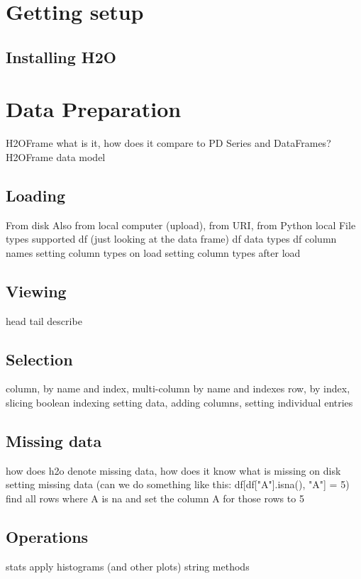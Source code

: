 \section{Getting setup}

\subsection{Installing H2O}


\section{Data Preparation}
H2OFrame what is it, how does it compare to PD Series and DataFrames?
H2OFrame data model

\subsection{Loading}
From disk
Also from local computer (upload), from URI, from Python local
File types supported
df (just looking at the data frame)
df data types
df column names
setting column types on load
setting column types after load

\subsection{Viewing}
head
tail
describe

\subsection{Selection}
column, by name and index, multi-column by name and indexes
row, by index, slicing
boolean indexing
setting data, adding columns, setting individual entries

\subsection{Missing data}
how does h2o denote missing data, how does it know what is missing on disk
setting missing data (can we do something like this: df[df["A"].isna(), "A"] = 5)
find all rows where A is na and set the column A for those rows to 5

\subsection{Operations}
stats
apply
histograms (and other plots)
string methods

